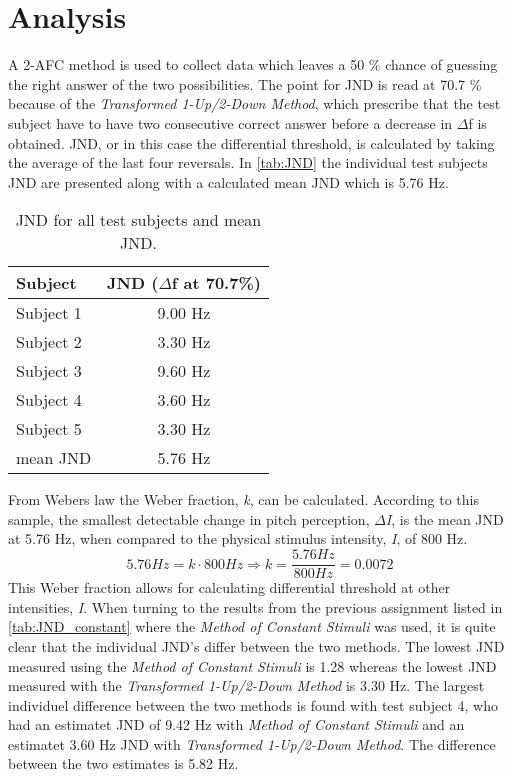 \section*{Analysis}
\label{analysis}
%
A 2-AFC method is used to collect data which leaves a 50 \% chance of guessing the right answer of the two possibilities. The point for JND is read at 70.7 \% because of the \textit{Transformed 1-Up/2-Down Method}, which prescribe that the test subject have to have two consecutive correct answer before a decrease in $\Delta$f is obtained.\blankline
%
JND, or in this case the differential threshold, is calculated by taking the average of the last four reversals. In \autoref{tab:JND} the individual test subjects JND are presented along with a calculated mean JND which is 5.76 Hz. 
%
\begin{table}[H]
	\centering
	\begin{tabular}{l|c}
		Subject     & JND ($\Delta$f at 70.7\%) \\\hline
		Subject 1   & 9.00 Hz          \\\hline
		Subject 2   & 3.30 Hz            \\\hline
		Subject 3   & 9.60 Hz              \\\hline
		Subject 4   & 3.60 Hz            \\\hline
		Subject 5   & 3.30 Hz               \\\hline
		mean JND &    5.76 Hz   
	\end{tabular}
	\caption{JND for all test subjects and mean JND.}
	\label{tab:JND}         
\end{table}
\noindent
%
From Webers law the Weber fraction, \textit{k}, can be calculated. According to this sample, the smallest detectable change in pitch perception, \textit{$\Delta$I}, is the mean JND at 5.76 Hz, when compared to the physical stimulus intensity, \textit{I}, of 800 Hz.
% 
\begin{equation}
5.76 Hz = k \cdot 800 Hz \Rightarrow k = \frac{5.76 Hz}{800 Hz} = 0.0072
\end{equation}
%
This Weber fraction allows for calculating differential threshold at other intensities, \textit{I}.\blankline 
%
When turning to the results from the previous assignment listed in \autoref{tab:JND_constant} where the \textit{Method of Constant Stimuli} was used, it is quite clear that the individual JND's differ between the two methods. The lowest JND measured using the \textit{Method of Constant Stimuli} is 1.28 whereas the lowest JND measured with the \textit{Transformed 1-Up/2-Down Method} is 3.30 Hz. The largest individuel difference between the two methods is found with test subject 4, who had an estimatet JND of 9.42 Hz with \textit{Method of Constant Stimuli} and an estimatet 3.60 Hz JND with \textit{Transformed 1-Up/2-Down Method}. The difference between the two estimates is 5.82 Hz.   
